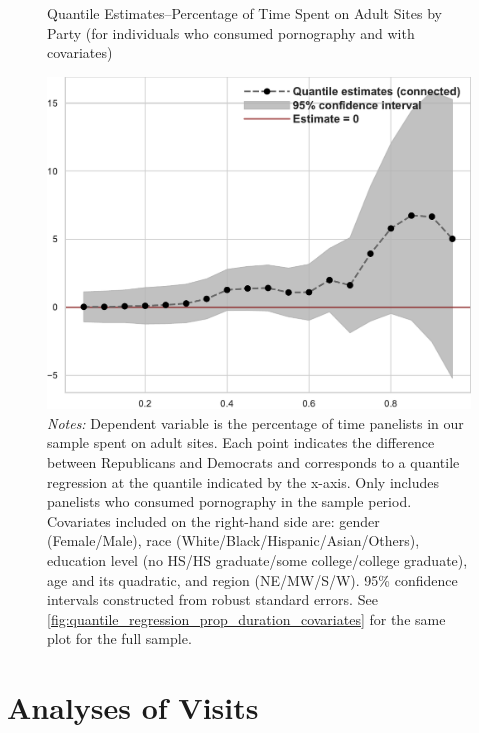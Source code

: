 \documentclass[12pt, letterpaper]{article}
\begin{document}
\begin{figure}[ht]
	\centering
	\caption{Quantile Estimates--Percentage of Time Spent on Adult Sites by Party (for individuals who consumed pornography and with covariates)}
	\includegraphics[width=.55\linewidth]{../figs/quantile_reg_nonzero_covariates_proportion_duration_adult.pdf}
	\caption*{\footnotesize \emph{Notes:} 
		Dependent variable is the percentage of time panelists in our sample spent on adult sites.
		Each point indicates the difference between Republicans and Democrats and corresponds to a quantile regression at the quantile indicated by the x-axis.
		Only includes panelists who consumed pornography in the sample period.
		Covariates included on the right-hand side are: gender (Female/Male), race (White/Black/Hispanic/Asian/Others), education level (no HS/HS graduate/some college/college graduate), age and its quadratic, and region (NE/MW/S/W).
		95\% confidence intervals constructed from robust standard errors.
		See \cref{fig:quantile_regression_prop_duration_covariates} for the same plot for the full sample.
	}
	\label{fig:quantile_regression_prop_duration_nonzeroes_covariates}
\end{figure}
\FloatBarrier
\section{Analyses of Visits}
\end{document}
